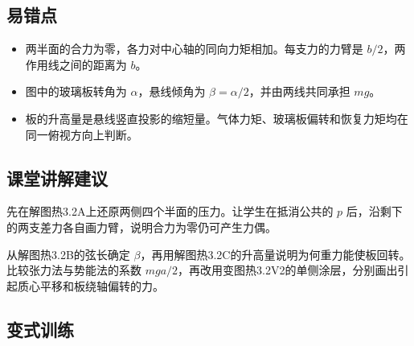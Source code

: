 \documentclass[UTF8,fontset=fandol,a4paper,11pt]{ctexart}
\begin{document}


\subsection*{易错点}

\begin{itemize}
\item 两半面的合力为零，各力对中心轴的同向力矩相加。每支力的力臂是 $b/2$，两作用线之间的距离为 $b$。
\item 图中的玻璃板转角为 $\alpha$，悬线倾角为 $\beta=\alpha/2$，并由两线共同承担 $mg$。
\item 板的升高量是悬线竖直投影的缩短量。气体力矩、玻璃板偏转和恢复力矩均在同一俯视方向上判断。
\end{itemize}



\subsection*{课堂讲解建议}

先在解图热3.2A上还原两侧四个半面的压力。让学生在抵消公共的 $p$ 后，沿剩下的两支差力各自画力臂，说明合力为零仍可产生力偶。

从解图热3.2B的弦长确定 $\beta$，再用解图热3.2C的升高量说明为何重力能使板回转。比较张力法与势能法的系数 $mga/2$，再改用变图热3.2V2的单侧涂层，分别画出引起质心平移和板绕轴偏转的力。



\subsection*{变式训练}
\end{document}
